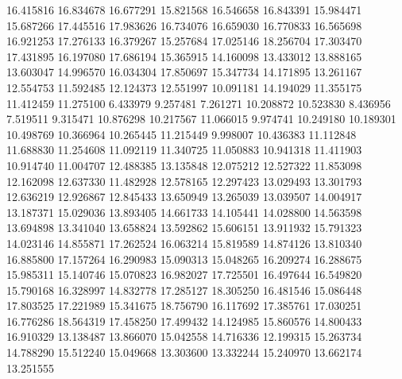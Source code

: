 16.415816
16.834678
16.677291
15.821568
16.546658
16.843391
15.984471
15.687266
17.445516
17.983626
16.734076
16.659030
16.770833
16.565698
16.921253
17.276133
16.379267
15.257684
17.025146
18.256704
17.303470
17.431895
16.197080
17.686194
15.365915
14.160098
13.433012
13.888165
13.603047
14.996570
16.034304
17.850697
15.347734
14.171895
13.261167
12.554753
11.592485
12.124373
12.551997
10.091181
14.194029
11.355175
11.412459
11.275100
6.433979
9.257481
7.261271
10.208872
10.523830
8.436956
7.519511
9.315471
10.876298
10.217567
11.066015
9.974741
10.249180
10.189301
10.498769
10.366964
10.265445
11.215449
9.998007
10.436383
11.112848
11.688830
11.254608
11.092119
11.340725
11.050883
10.941318
11.411903
10.914740
11.004707
12.488385
13.135848
12.075212
12.527322
11.853098
12.162098
12.637330
11.482928
12.578165
12.297423
13.029493
13.301793
12.636219
12.926867
12.845433
13.650949
13.265039
13.039507
14.004917
13.187371
15.029036
13.893405
14.661733
14.105441
14.028800
14.563598
13.694898
13.341040
13.658824
13.592862
15.606151
13.911932
15.791323
14.023146
14.855871
17.262524
16.063214
15.819589
14.874126
13.810340
16.885800
17.157264
16.290983
15.090313
15.048265
16.209274
16.288675
15.985311
15.140746
15.070823
16.982027
17.725501
16.497644
16.549820
15.790168
16.328997
14.832778
17.285127
18.305250
16.481546
15.086448
17.803525
17.221989
15.341675
18.756790
16.117692
17.385761
17.030251
16.776286
18.564319
17.458250
17.499432
14.124985
15.860576
14.800433
16.910329
13.138487
13.866070
15.042558
14.716336
12.199315
15.263734
14.788290
15.512240
15.049668
13.303600
13.332244
15.240970
13.662174
13.251555

